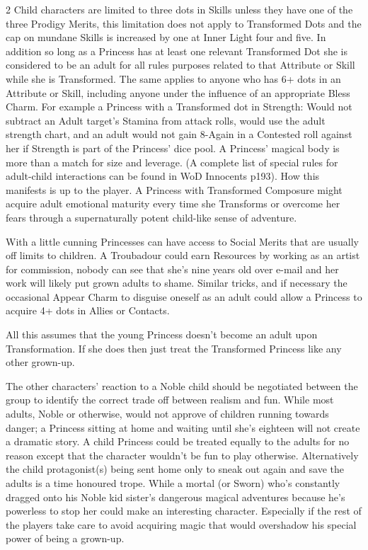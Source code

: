 \begin{multicols}{2}
Child characters are limited to three dots in Skills unless they have one of the three Prodigy Merits, this limitation does not apply to Transformed Dots and the cap on mundane Skills is increased by one at Inner Light four and five. In addition so long as a Princess has at least one relevant Transformed Dot she is considered to be an adult for all rules purposes related to that Attribute or Skill while she is Transformed. The same applies to anyone who has 6+ dots in an Attribute or Skill, including anyone under the influence of an appropriate Bless Charm. For example a Princess with a Transformed dot in Strength: Would not subtract an Adult target's Stamina from attack rolls, would use the adult strength chart, and an adult would not gain 8-Again in a Contested roll against her if Strength is part of the Princess' dice pool. A Princess' magical body is more than a match for size and leverage. (A complete list of special rules for adult-child interactions can be found in WoD Innocents p193). How this manifests is up to the player. A Princess with Transformed Composure might acquire adult emotional maturity every time she Transforms or overcome her fears through a supernaturally potent child-like sense of adventure. 

With a little cunning Princesses can have access to Social Merits that are usually off limits to children. A Troubadour could earn Resources by working as an artist for commission, nobody can see that she's nine years old over e-mail and her work will likely put grown adults to shame. Similar tricks, and if necessary the occasional Appear Charm to disguise oneself as an adult could allow a Princess to acquire 4+ dots in Allies or Contacts. 

All this assumes that the young Princess doesn't become an adult upon Transformation. If she does then just treat the Transformed Princess like any other grown-up.

The other characters' reaction to a Noble child should be negotiated between the group to identify the correct trade off between realism and fun. While most adults, Noble or otherwise, would not approve of children running towards danger; a Princess sitting at home and waiting until she's eighteen will not create a dramatic story. A child Princess could be treated equally to the adults for no reason except that the character wouldn't be fun to play otherwise. Alternatively the child protagonist(s) being sent home only to sneak out again and save the adults is a time honoured trope. While a mortal (or Sworn) who's constantly dragged onto his Noble kid sister's dangerous magical adventures because he's powerless to stop her could make an interesting character. Especially if the rest of the players take care to avoid acquiring magic that would overshadow his special power of being a grown-up. 
\bigsidebarend


\end{multicols}
